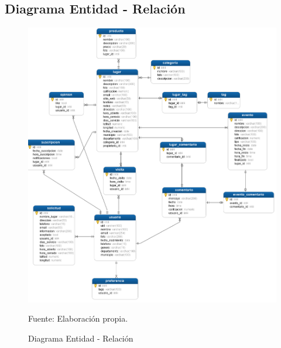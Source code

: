 \documentclass[12pt,letterpaper,openany]{book}
\begin{document}
\subsection{Diagrama Entidad - Relación}
\begin{figure}[H]
\begin{center}
\includegraphics[width=16cm]{./imagenes/Diagrama_entidad_relacion}
\caption{Diagrama Entidad - Relación}
\centering Fuente: Elaboración propia.
\end{center}
\end{figure}
\end{document}
